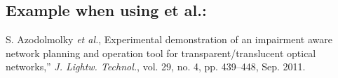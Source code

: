 \documentclass[journal]{IEEEtran}
\begin{document}
\subsection*{Example when using et al.:}

\begin{thebibliography}{34}
\setcounter{enumiv}{33}

\bibitem{}S. Azodolmolky {\em et al.}, Experimental demonstration of an impairment aware network planning and operation tool for transparent/translucent optical networks,'' {\em J. Lightw. Technol.}, vol. 29, no. 4, pp. 439--448, Sep. 2011.
\end{thebibliography}
\end{document}
